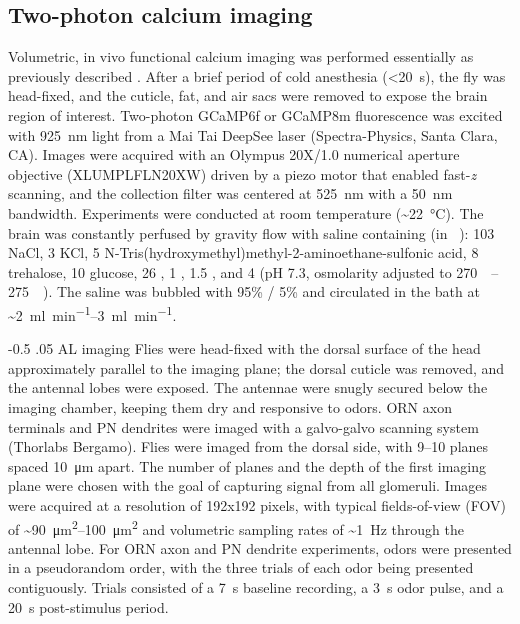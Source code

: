 \documentclass[12pt]{caltech_thesis}
\makeatletter
\renewcommand{\cite}{{ }\autocite}
\let\Oldsubsection\subsection
\renewcommand{\subsection}{\FloatBarrier\Oldsubsection}
\let\Oldsubsubsection\subsubsection
\renewcommand{\subsubsection}{\FloatBarrier\Oldsubsubsection}
\renewcommand\subsubsection{%
    \@startsection{subsubsection}{4}{0mm}%
       {-0.5\baselineskip}%
       {.05\baselineskip}%
       {\normalfont\normalsize\bfseries\itshape}}
\makeatother
\begin{document}
\begin{refsection}
\subsection{Two-photon calcium imaging}
Volumetric, in vivo functional calcium imaging was performed essentially as previously described\cite{HongWilson2015,Zocchi2022}.
After a brief period of cold anesthesia (<\qty{20}{\second}), the fly was head-fixed, and the cuticle, fat, and air sacs were removed to expose the brain region of interest.
Two-photon GCaMP6f or GCaMP8m fluorescence was excited with \qty{925}{\nano\metre} light from a Mai Tai DeepSee laser (Spectra-Physics, Santa Clara, CA).
Images were acquired with an Olympus 20X/1.0 numerical aperture objective (XLUMPLFLN20XW) driven by a piezo motor that enabled fast-\textit{z} scanning, and the collection filter was centered at \qty{525}{\nano\metre} with a \qty{50}{\nano\metre} bandwidth.
Experiments were conducted at room temperature (\textasciitilde\qty{22}{\degreeCelsius}).
The brain was constantly perfused by gravity flow with saline containing (in \unit{\milli\molar}): 103 NaCl, 3 KCl, 5 N-Tris(hydroxymethyl)methyl-2-aminoethane-sulfonic acid, 8 trehalose, 10 glucose, 26 , 1 , 1.5 , and 4  (pH 7.3, osmolarity adjusted to \qtyrange{270}{275}{\milli\osmole}).
The saline was bubbled with 95\%  / 5\%  and circulated in the bath at \textasciitilde\qtyrange{2}{3}{\milli\litre\per\minute}.

\subsubsection{AL imaging}
Flies were head-fixed with the dorsal surface of the head approximately parallel to
the imaging plane; the dorsal cuticle was removed, and the antennal lobes were exposed.
The antennae were snugly secured below the imaging chamber, keeping them dry and responsive to odors.
ORN axon terminals and PN dendrites were imaged with a galvo-galvo scanning system (Thorlabs Bergamo).
Flies were imaged from the dorsal side, with \numrange{9}{10} planes spaced \qty{10}{\micro\metre} apart.
The number of planes and the depth of the first imaging plane were chosen with the goal of capturing signal from all glomeruli.
Images were acquired at a resolution of 192x192 pixels, with typical fields-of-view (FOV) of \textasciitilde\qtyrange{90}{100}{\micro\metre\squared} and volumetric sampling rates of \textasciitilde\qty{1}{\hertz} through the antennal lobe.
For ORN axon and PN dendrite experiments, odors were presented in a pseudorandom order, with the three trials of each odor being presented contiguously.
Trials consisted of a \qty{7}{\second} baseline recording, a \qty{3}{\second} odor pulse, and a \qty{20}{\second} post-stimulus period.


\end{refsection}
\end{document}
